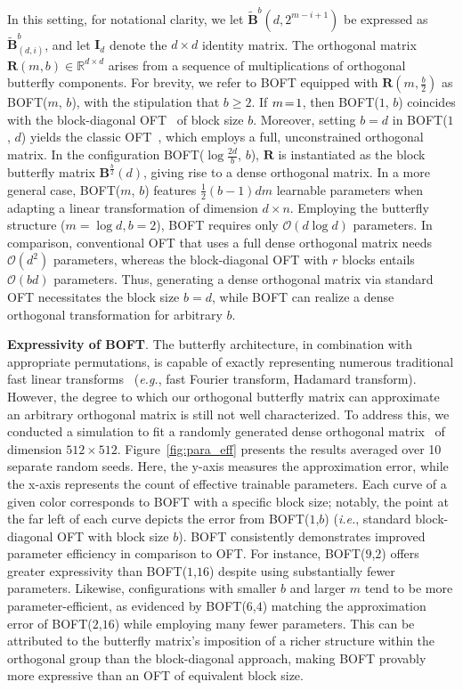 In this setting, for notational clarity, we let $\tilde{\bm{B}}^b(d,2^{m - i+1})$ be expressed as $\tilde{\bm{B}}^b_{(d,i)}$, and let $\bm{I}_d$ denote the $d \times d$ identity matrix. The orthogonal matrix $\bm{R}(m,b) \in \mathbb{R}^{d \times d}$ arises from a sequence of multiplications of orthogonal butterfly components. For brevity, we refer to BOFT equipped with $\bm{R}(m,\frac{b}{2})$ as BOFT($m$, $b$), with the stipulation that $b \geq 2$. If $\thickmuskip=2mu \medmuskip=2mu m=1$, then BOFT($1$, $b$) coincides with the block-diagonal OFT~\cite{qiu2023controlling} of block size $b$. Moreover, setting $b=d$ in BOFT($1$, $d$) yields the classic OFT~\cite{qiu2023controlling}, which employs a full, unconstrained orthogonal matrix. In the configuration BOFT($\log \frac{2d}{b}$, $b$), $\bm{R}$ is instantiated as the block butterfly matrix $\bm{B}^{\frac{b}{2}}(d)$, giving rise to a dense orthogonal matrix. In a more general case, BOFT($m$, $b$) features $\frac{1}{2}(b-1)dm$ learnable parameters when adapting a linear transformation of dimension $d\times n$. Employing the butterfly structure ($m = \log d, b=2$), BOFT requires only $\mathcal{O}(d\log d)$ parameters. In comparison, conventional OFT that uses a full dense orthogonal matrix needs $\mathcal{O}(d^2)$ parameters, whereas the block-diagonal OFT with $r$ blocks entails $\mathcal{O}(bd)$ parameters. Thus, generating a dense orthogonal matrix via standard OFT necessitates the block size $b=d$, while BOFT can realize a dense orthogonal transformation for arbitrary $b$.

\textbf{Expressivity of BOFT}. The butterfly architecture, in combination with appropriate permutations, is capable of exactly representing numerous traditional fast linear transforms~\cite{dao2019learning,dao2019kaleidoscope} (\emph{e.g.}, fast Fourier transform, Hadamard transform). However, the degree to which our orthogonal butterfly matrix can approximate an arbitrary orthogonal matrix is still not well characterized. To address this, we conducted a simulation to fit a randomly generated dense orthogonal matrix~\cite{anderson1987generation} of dimension $512\times 512$. Figure~\ref{fig:para_eff} presents the results averaged over 10 separate random seeds. Here, the y-axis measures the approximation error, while the x-axis represents the count of effective trainable parameters. Each curve of a given color corresponds to BOFT with a specific block size; notably, the point at the far left of each curve depicts the error from BOFT($1$,$b$) (\emph{i.e.}, standard block-diagonal OFT with block size $b$). BOFT consistently demonstrates improved parameter efficiency in comparison to OFT. For instance, BOFT($9$,$2$) offers greater expressivity than BOFT($1$,$16$) despite using substantially fewer parameters. Likewise, configurations with smaller $b$ and larger $m$ tend to be more parameter-efficient, as evidenced by BOFT($6$,$4$) matching the approximation error of BOFT($2$,$16$) while employing many fewer parameters. This can be attributed to the butterfly matrix’s imposition of a richer structure within the orthogonal group than the block-diagonal approach, making BOFT provably more expressive than an OFT of equivalent block size.

